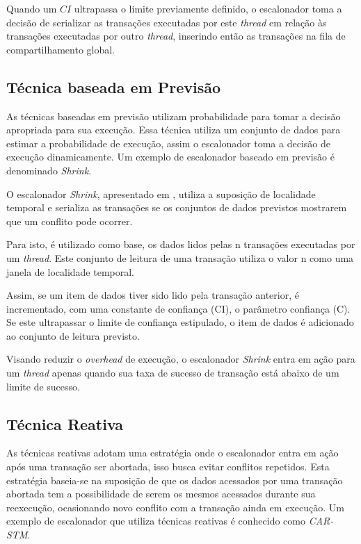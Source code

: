 \documentclass[ti]{texufpel}
\begin{document}
Quando um $CI$ ultrapassa o limite previamente definido, o escalonador toma a decisão de serializar as transações executadas por este \emph{thread} em relação às transações executadas por outro \emph{thread}, inserindo então as transações na fila de compartilhamento global.


\subsection{Técnica baseada em Previsão}

As técnicas baseadas em previsão utilizam probabilidade para tomar a decisão apropriada para sua execução. Essa técnica utiliza um conjunto de dados para estimar a probabilidade de execução, assim o escalonador toma a decisão de execução dinamicamente. Um exemplo de escalonador baseado em previsão é denominado \emph{Shrink}.

O escalonador \emph{Shrink}, apresentado em \cite{dragojevic09}, utiliza a suposição de localidade temporal e serializa as transações se os conjuntos de dados previstos mostrarem que um conflito pode ocorrer.

Para isto, é utilizado como base, os dados lidos pelas n transações executadas por um \emph{thread}. Este conjunto de leitura de uma transação utiliza o valor n como uma janela de localidade temporal.

Assim, se um item de dados tiver sido lido pela transação anterior, é incrementado, com uma constante de confiança (CI), o parâmetro confiança (C). Se este ultrapassar o limite de confiança estipulado, o item de dados é adicionado ao conjunto de leitura previsto.

Visando reduzir o \emph{overhead} de execução, o escalonador \emph{Shrink} entra em ação para um \emph{thread} apenas quando sua taxa de sucesso de transação está abaixo de um limite de sucesso.


\subsection{Técnica Reativa}

As técnicas reativas adotam uma estratégia onde o escalonador entra em ação após uma transação ser abortada, isso busca evitar conflitos repetidos. Esta estratégia baseia-se na suposição de que os dados acessados por uma transação abortada tem a possibilidade de serem os mesmos acessados durante sua reexecução, ocasionando novo conflito com a transação ainda em execução. Um exemplo de escalonador que utiliza técnicas reativas é conhecido como \emph{CAR-STM}.
\end{document}
